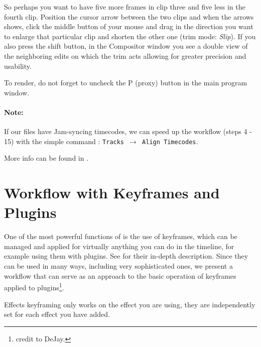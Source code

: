 So perhaps you want to have five more frames in clip three and five less in the fourth clip. Position the cursor arrow between the two clips and when the arrows shows, click the middle button of your mouse and drag in the direction you want to enlarge that particular clip and shorten the other one (trim mode: \textit{Slip}). If you also press the shift button, in the Compositor window you see a double view of the neighboring edits on which the trim acts allowing for greater precision and usability.

To render, do not forget to uncheck the P (proxy) button in the main program window.

\paragraph{Note:} If our files have Jam-syncing timecodes, we can speed up the workflow (steps 4 - 15) with the simple command : \texttt{Tracks $\rightarrow$ Align Timecodes}.

More info can be found in .

\section{Workflow with Keyframes and Plugins}%
\label{sec:workflow_keyframes_plugins}

One of the most powerful functions of \CGG{} is the use of keyframes, which can be managed and applied for virtually anything you can do in the timeline, for example using them with plugins. See  for their in-depth description. Since they can be used in many ways, including very sophisticated ones, we present a workflow that can serve as an approach to the basic operation of keyframes applied to plugins\protect\footnote{credit to DeJay.}.

Effects keyframing only works on the effect you are using, they are independently set for each effect you have added.

